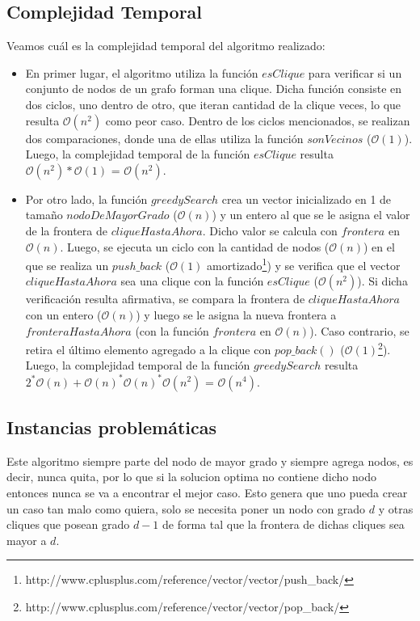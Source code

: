\subsection{Complejidad Temporal}
Veamos cuál es la complejidad temporal del algoritmo realizado:
\begin{itemize}
\item En primer lugar, el algoritmo utiliza la función $esClique$ para verificar si un conjunto de nodos de un grafo forman una clique. Dicha función consiste en dos ciclos, uno dentro de otro, que iteran cantidad de la clique veces, lo que resulta $\mathcal{O}(n^2)$ como peor caso. Dentro de los ciclos mencionados, se realizan dos comparaciones, donde una de ellas utiliza la función $sonVecinos$ ($\mathcal{O}(1)$). Luego, la complejidad temporal de la función $esClique$ resulta $\mathcal{O}(n^2)*\mathcal{O}(1)$ = $\mathcal{O}(n^2)$.

\item Por otro lado, la función $greedySearch$ crea un vector inicializado en 1 de tamaño $nodoDeMayorGrado$ ($\mathcal{O}(n)$) y un entero al que se le asigna el valor de la frontera de $cliqueHastaAhora$. Dicho valor se calcula con $frontera$ en $\mathcal{O}(n)$. Luego, se ejecuta un ciclo con la cantidad de nodos ($\mathcal{O}(n)$) en el que se realiza un $push\_back$ ($\mathcal{O}(1)$ amortizado\footnote{http://www.cplusplus.com/reference/vector/vector/push\_back/}) y se verifica que el vector $cliqueHastaAhora$ sea una clique con la función $esClique$ ($\mathcal{O}(n^2)$). Si dicha verificación resulta afirmativa, se compara la frontera de $cliqueHastaAhora$ con un entero ($\mathcal{O}(n)$) y luego se le asigna la nueva frontera a $fronteraHastaAhora$ (con la función $frontera$ en $\mathcal{O}(n)$). Caso contrario, se retira el último elemento agregado a la clique con $pop\_back()$ ($\mathcal{O}(1)$\footnote{http://www.cplusplus.com/reference/vector/vector/pop\_back/}).\newline
\newline
Luego, la complejidad temporal de la función $greedySearch$ resulta $2^*\mathcal{O}(n)+\mathcal{O}(n)^*\mathcal{O}(n)^*\mathcal{O}(n^2)$ = $\mathcal{O}(n^4)$.

\end{itemize}
\subsection{Instancias problemáticas}
Este algoritmo siempre parte del nodo de mayor grado y siempre agrega nodos, es decir, nunca quita, por lo que si la solucion optima no contiene dicho nodo entonces nunca se va a encontrar el mejor caso. \newline
 Esto genera que uno pueda crear un caso tan malo como quiera, solo se necesita poner un nodo con grado $d$ y otras cliques que posean grado $d-1$ de forma tal que la frontera de dichas cliques sea mayor a $d$.
 
